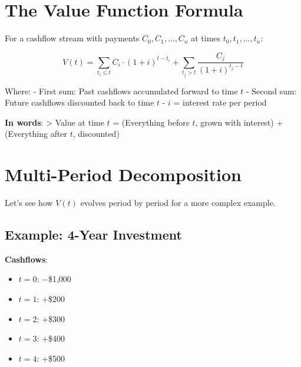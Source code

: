 \documentclass[
  letterpaper,
]{scrbook}
\providecommand{\tightlist}{%
  \setlength{\itemsep}{0pt}\setlength{\parskip}{0pt}}
\begin{document}
\section{The Value Function Formula}\label{the-value-function-formula}

\begin{tcolorbox}[enhanced jigsaw, toptitle=1mm, colbacktitle=quarto-callout-important-color!10!white, opacityback=0, leftrule=.75mm, breakable, colframe=quarto-callout-important-color-frame, toprule=.15mm, opacitybacktitle=0.6, coltitle=black, bottomrule=.15mm, colback=white, arc=.35mm, titlerule=0mm, rightrule=.15mm, left=2mm, title=\textcolor{quarto-callout-important-color}{\faExclamation}\hspace{0.5em}{Key Formula: Value Function}, bottomtitle=1mm]

For a cashflow stream with payments \(C_0, C_1, ..., C_n\) at times
\(t_0, t_1, ..., t_n\):

\[
V(t) = \sum_{t_i \leq t} C_i \cdot (1+i)^{t-t_i} + \sum_{t_j > t} \frac{C_j}{(1+i)^{t_j - t}}
\]

Where: - First sum: Past cashflows accumulated forward to time \(t\) -
Second sum: Future cashflows discounted back to time \(t\) - \(i\) =
interest rate per period

\end{tcolorbox}

\textbf{In words}: \textgreater{} Value at time \(t\) = (Everything
before \(t\), grown with interest) + (Everything after \(t\),
discounted)

\section{Multi-Period Decomposition}\label{multi-period-decomposition}

Let's see how \(V(t)\) evolves period by period for a more complex
example.

\subsection{Example: 4-Year Investment}\label{example-4-year-investment}

\textbf{Cashflows}:

\begin{itemize}
\tightlist
\item
  \(t=0\): −\$1,000
\item
  \(t=1\): +\$200
\item
  \(t=2\): +\$300
\item
  \(t=3\): +\$400
\item
  \(t=4\): +\$500
\end{itemize}
\end{document}
